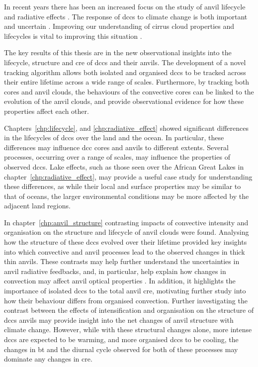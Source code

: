 In recent years there has been an increased focus on the study of anvil lifecycle \citep{wall_life_2018, sokol_tropical_2020} and radiative effects \citep{bouniol_life_2021}.
The response of \acrshort{dcc}s to climate change is both important and uncertain \citep{sherwood_assessment_2020, hill_climate_2023}.
Improving our understanding of cirrus cloud properties and lifecycles is vital to improving this situation \citep{sullivan_ice_2021, gasparini_opinion_2023}.

The key results of this thesis are in the new observational insights into the lifecycle, structure and \acrshort{cre} of \acrshort{dcc}s and their anvils.
The development of a novel tracking algorithm allows both isolated and organised \acrshort{dcc}s to be tracked across their entire lifetime across a wide range of scales.
Furthermore, by tracking both cores and anvil clouds, the behaviours of the convective cores can be linked to the evolution of the anvil clouds, and provide observational evidence for how these properties affect each other.

Chapters~\ref{chp:lifecycle}, and \ref{chp:radiative_effect} showed significant differences in the lifecycles of \acrshort{dcc}s over the land and the ocean.
In particular, these differences may influence \acrshort{dcc} cores and anvils to different extents.
Several processes, occurring over a range of scales, may influence the properties of observed \acrshort{dcc}s.
Lake effects, such as those seen over the African Great Lakes in chapter~\ref{chp:radiative_effect}, may provide a useful case study for understanding these differences, as while their local and surface properties may be similar to that of oceans, the larger environmental conditions may be more affected by the adjacent land regions.

In chapter~\ref{chp:anvil_structure} contrasting impacts of convective intensity and organisation on the structure and lifecycle of anvil clouds were found. 
Analysing how the structure of these \acrshort{dcc}s evolved over their lifetime provided key insights into which convective and anvil processes lead to the observed changes in thick thin anvils.
These contrasts may help further understand the uncertainties in anvil radiative feedbacks, and, in particular, help explain how changes in convection may affect anvil optical properties \citep{mckim_weak_2024}.
In addition, it highlights the importance of isolated \acrshort{dcc}s to the total anvil \acrshort{cre}, motivating further study into how their behaviour differs from organised convection.
Further investigating the contrast between the effects of intensification and organisation on the structure of \acrshort{dcc}s anvils may provide insight into the net changes of anvil structure with climate change. However, while with these structural changes alone, more intense \acrshort{dcc}s are expected to be warming, and more organised \acrshort{dcc}s to be cooling, the changes in \acrshort{bt} and the diurnal cycle observed for both of these processes may dominate any changes in \acrshort{cre}.


